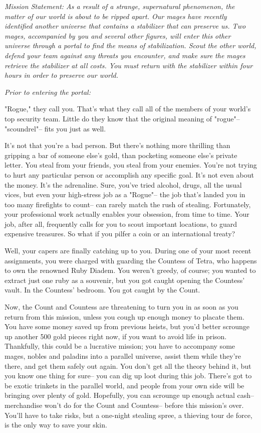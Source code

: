 \documentclass[char]{guildcamp3}
\begin{document}
\name{\cRogueTwo{}}

\em{Mission Statement:} 
As a result of a strange, supernatural phenomenon, the matter of our world is about to be ripped apart. Our mages have recently identified another universe that contains a stabilizer that can preserve us. Two mages, accompanied by you and several other figures, will enter this other universe through a portal to find the means of stabilization. Scout the other world, defend your team against any threats you encounter, and make sure the mages retrieve the stabilizer at all costs. You must return with the stabilizer within four hours in order to preserve our world.

\em{Prior to entering the portal:}

"Rogue," they call you. That's what they call all of the members of your world's top security team. Little do they know that the original meaning of "rogue"-- "scoundrel"-- fits you just as well. 

It's not that you're a bad person. But there's nothing more thrilling than gripping a bar of someone else's gold, than pocketing someone else's private letter. You steal from your friends, you steal from your enemies. You're not trying to hurt any particular person or accomplish any specific goal. It's not even about the money. It's the adrenaline. Sure, you've tried alcohol, drugs, all the usual vices, but even your high-stress job as a "Rogue"-- the job that's landed you in too many firefights to count-- can rarely match the rush of stealing. Fortunately, your professional work actually enables your obsession, from time to time. Your job, after all, frequently calls for you to scout important locations, to guard expensive treasures. So what if you pilfer a coin or an international treaty?

Well, your capers are finally catching up to you. During one of your most recent assignments, you were charged with guarding the Countess of Tetra, who happens to own the renowned Ruby Diadem. You weren't greedy, of course; you wanted to extract just one ruby as a souvenir, but you got caught opening the Countess' vault. In the Countess' bedroom. You got caught by the Count.

Now, the Count and Countess are threatening to turn you in as soon as you return from this mission, unless you cough up enough money to placate them. You have some money saved up from previous heists, but you'd better scrounge up another 500 gold pieces right now, if you want to avoid life in prison. Thankfully, this could be a lucrative mission; you have to accompany some mages, nobles and paladins into a parallel universe, assist them while they're there, and get them safely out again. You don't get all the theory behind it, but you know one thing for sure-- you can dig up loot during this job. There's got to be exotic trinkets in the parallel world, and people from your own side will be bringing over plenty of gold. Hopefully, you can scrounge up enough actual cash-- merchandise won't do for the Count and Countess-- before this mission's over. You'll have to take risks, but a one-night stealing spree, a thieving tour de force, is the only way to save your skin.
\end{document}
